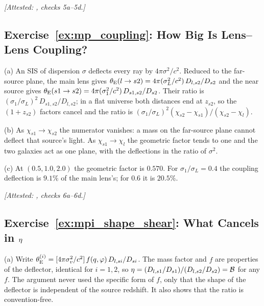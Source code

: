 \emph{[Attested: ,
checks 5a--5d.]}

\subsection*{Exercise~\ref{ex:mp_coupling}: How Big Is Lens--Lens Coupling?}

(a) An SIS of dispersion $\sigma$ deflects every ray by
$4\pi\sigma^2/c^2$.  Reduced to the far-source plane, the main lens gives
$\theta_{\rm E}(l\to s2)=4\pi(\sigma_L^2/c^2)\,D_{l,s2}/D_{s2}$ and the
near source gives
$\theta_{\rm E}(s1\to s2)=4\pi(\sigma_1^2/c^2)\,D_{s1,s2}/D_{s2}$.
Their ratio is
$(\sigma_1/\sigma_L)^2\,D_{s1,s2}/D_{l,s2}$; in a flat universe both
distances end at $z_{s2}$, so the $(1+z_{s2})$ factors cancel and the
ratio is $(\sigma_1/\sigma_L)^2(\chi_{s2}-\chi_{s1})/(\chi_{s2}-\chi_l)$.

(b) As $\chi_{s1}\to\chi_{s2}$ the numerator vanishes: a mass
on the far-source plane cannot deflect that source's light.  As
$\chi_{s1}\to\chi_l$ the geometric factor tends to one and the two
galaxies act as one plane, with the deflections in the ratio of
$\sigma^2$.

(c) At $(0.5,1.0,2.0)$ the geometric factor is $0.570$.  For
$\sigma_1/\sigma_L=0.4$ the coupling deflection is $9.1\%$ of the main
lens's; for $0.6$ it is $20.5\%$.

\emph{[Attested: ,
checks 6a--6d.]}

\subsection*{Exercise~\ref{ex:mpi_shape_shear}: What Cancels in $\eta$}

(a) Write
$\theta_{\mathrm{E}}^{(i)}=[4\pi\sigma_v^2/c^2]\,f(q,\varphi)\,D_{l,si}/D_{si}$.  The
mass factor and $f$ are properties of the deflector, identical for $i=1,2$,
so
$\eta=(D_{l,s1}/D_{s1})/(D_{l,s2}/D_{s2})=\mathcal{B}$ for any $f$.
The argument never used the specific form of $f$, only that the shape of
the deflector is independent of the source redshift.  It also shows that
the ratio is convention-free.

